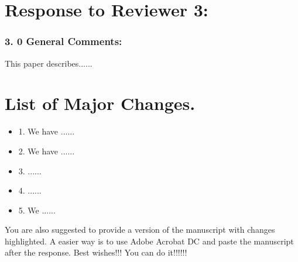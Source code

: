 \documentclass{article}
\begin{document}
\section*{Response to Reviewer 3:}
\subsubsection*{3. 0   General Comments:}
This paper describes......



\section*{List of Major Changes.}
\begin{itemize}
    \item{1.} We have ......
    \item{2.} We have ......
    \item{3.} ......
    \item{4.} ......
    \item{5.} We ......

\end{itemize}

You are also suggested to provide a version of the manuscript with changes highlighted. A easier way is to use Adobe Acrobat DC and paste the manuscript after the response. Best wishes!!! You can do it!!!!!!
\end{document}
